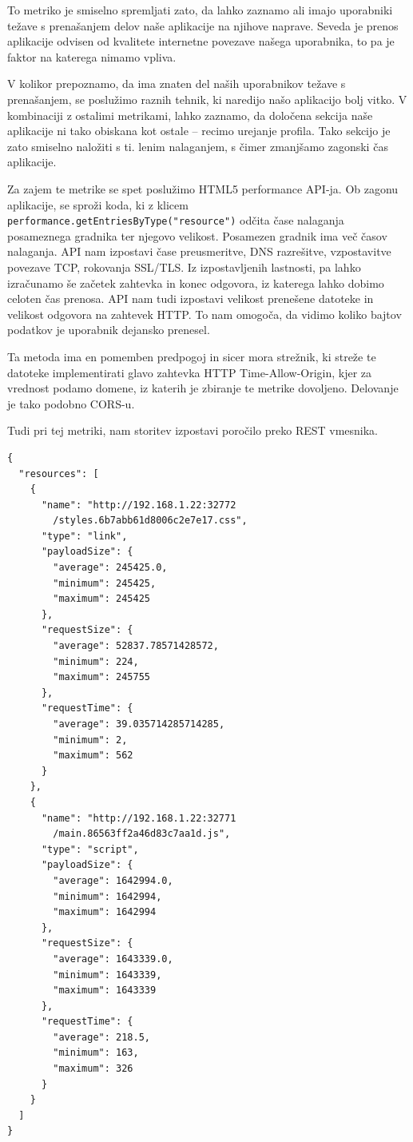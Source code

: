 \documentclass[a4paper, 12pt]{book}
\begin{document}
To metriko je smiselno spremljati zato, da lahko zaznamo ali imajo uporabniki težave s prenašanjem delov naše aplikacije na njihove naprave. Seveda je prenos aplikacije odvisen od kvalitete internetne povezave našega uporabnika, to pa je faktor na katerega nimamo vpliva.

V kolikor prepoznamo, da ima znaten del naših uporabnikov težave s prenašanjem, se poslužimo raznih tehnik, ki naredijo našo aplikacijo bolj vitko. V kombinaciji z ostalimi metrikami, lahko zaznamo, da določena sekcija naše aplikacije ni tako obiskana kot ostale -- recimo urejanje profila. Tako sekcijo je zato smiselno naložiti s ti. lenim nalaganjem, s čimer zmanjšamo zagonski čas aplikacije.

Za zajem te metrike se spet poslužimo HTML5 performance API-ja. Ob zagonu aplikacije, se sproži koda, ki z klicem \\ \verb|performance.getEntriesByType("resource")| odčita čase nalaganja posameznega gradnika ter njegovo velikost. Posamezen gradnik ima več časov nalaganja. API nam izpostavi čase preusmeritve, DNS razrešitve, vzpostavitve povezave TCP, rokovanja SSL/TLS. Iz izpostavljenih lastnosti, pa lahko izračunamo še začetek zahtevka in konec odgovora, iz katerega lahko dobimo celoten čas prenosa. API nam tudi izpostavi velikost prenešene datoteke in velikost odgovora na zahtevek HTTP. To nam omogoča, da vidimo koliko bajtov podatkov je uporabnik dejansko prenesel.

Ta metoda ima en pomemben predpogoj in sicer mora strežnik, ki streže te datoteke implementirati glavo zahtevka HTTP Time-Allow-Origin, kjer za vrednost podamo domene, iz katerih je zbiranje te metrike dovoljeno. Delovanje je tako podobno CORS-u.

Tudi pri tej metriki, nam storitev izpostavi poročilo preko REST vmesnika.

\begin{lstlisting}[label=code:resource_load_report, caption=Poročilo časa nalaganja gradnikov strani]
{
  "resources": [
    {
      "name": "http://192.168.1.22:32772
        /styles.6b7abb61d8006c2e7e17.css",
      "type": "link",
      "payloadSize": {
        "average": 245425.0,
        "minimum": 245425,
        "maximum": 245425
      },
      "requestSize": {
        "average": 52837.78571428572,
        "minimum": 224,
        "maximum": 245755
      },
      "requestTime": {
        "average": 39.035714285714285,
        "minimum": 2,
        "maximum": 562
      }
    },
    {
      "name": "http://192.168.1.22:32771
        /main.86563ff2a46d83c7aa1d.js",
      "type": "script",
      "payloadSize": {
        "average": 1642994.0,
        "minimum": 1642994,
        "maximum": 1642994
      },
      "requestSize": {
        "average": 1643339.0,
        "minimum": 1643339,
        "maximum": 1643339
      },
      "requestTime": {
        "average": 218.5,
        "minimum": 163,
        "maximum": 326
      }
    }
  ]
}
\end{lstlisting}
\end{document}
